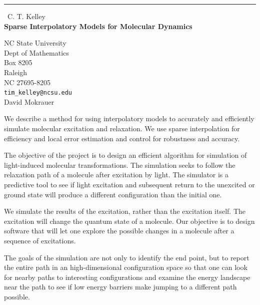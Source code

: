 \documentclass{report}
\begin{document}
\begin{center}
\rule{6in}{1pt} \
{\large C. T. Kelley \\
{\bf Sparse Interpolatory Models for Molecular Dynamics}}

NC State University \\ Dept of Mathematics \\ Box 8205 \\ Raleigh \\ NC 27695-8205
\\
{\tt tim\_kelley@ncsu.edu}\\
David Mokrauer\end{center}

We describe a method for using interpolatory models to accurately and
efficiently simulate molecular excitation and relaxation. We use
sparse interpolation for efficiency and local error estimation and
control for robustness and accuracy.

The objective of the project is to design an efficient
algorithm for simulation of light-induced molecular transformations.
The simulation seeks to follow the relaxation path of a molecule
after excitation by light. The simulator is a predictive tool to
see if light excitation and subsequent return to the unexcited
or ground state will produce a different configuration than
the initial one.

We simulate the results of the excitation, rather than the excitation
itself. The excitation will change the quantum state of a molecule. Our
objective is to design software that will let one explore the possible
changes in a molecule after a sequence of excitations.

The goals of the simulation are not only
to identify the end point, but to report the entire path in
an high-dimensional configuration space so that
one can look for nearby paths to interesting configurations and examine
the energy landscape near the path to see if low energy barriers make
jumping to a different path possible.
\end{document}
